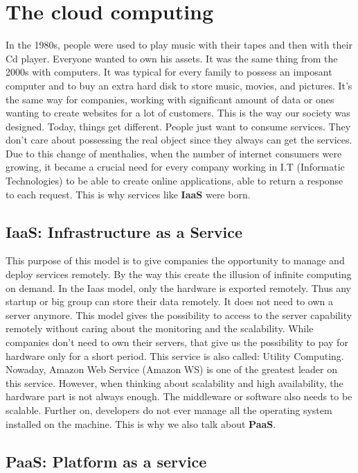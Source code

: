 
\section{The cloud computing}

In the 1980s, people were used to play music with their tapes and then with their Cd player. Everyone wanted to own his assets. It was the same thing from the 2000s with computers. It was typical for every family to possess an imposant computer and to buy an extra hard disk to store music, movies, and pictures. It's the same way for companies, working with significant amount of data or ones wanting to create websites for a lot of customers. This is the way our society was designed. Today, things get different. People just want to consume services. They don’t care about possessing the real object since they always can get the services. Due to this change of menthalies, when the number of internet consumers were growing, it became a crucial need for every company working in I.T (Informatic Technologies) to be able to create online applications, able to return a response to each request. This is why services like \textbf{IaaS} were born.

\subsection{IaaS: Infrastructure as a Service}

This purpose of this model is to give companies the opportunity to manage and deploy services remotely. By the way this create the illusion of infinite computing on demand. In the Iaas model, only the hardware is exported remotely. Thus any startup or big group can store their data remotely. It does not need to own a server anymore. This model gives the possibility to access to the server capability remotely without caring about the monitoring and the scalability. While companies don't need to own their servers, that give us the possibility to pay for hardware only for a short period. This service is also called: Utility Computing. Nowaday, Amazon Web Service (Amazon WS) is one of the greatest leader on this service. However, when thinking about scalability and high availability, the hardware part is not always enough. The middleware or software also needs to be scalable. Further on, developers do not ever manage all the operating system installed on the machine. This is why we also talk about \textbf{PaaS}.

\subsection{PaaS: Platform as a service}

